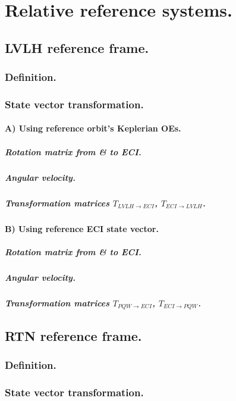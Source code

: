{\section{Relative reference systems.}
%
	
	\subsection{LVLH reference frame.}
		\subsubsection{Definition.}
		\subsubsection{State vector transformation.}
		\paragraph{A) Using reference orbit's Keplerian OEs. \\}
			\subparagraph{Rotation matrix from \& to ECI. \\}
			\subparagraph{Angular velocity. \\}
			\subparagraph{Transformation matrices $T_{LVLH\rightarrow ECI}$, $T_{ECI\rightarrow LVLH}$. \\}
		\paragraph{B) Using reference ECI state vector. \\}
			\subparagraph{Rotation matrix from \& to ECI. \\}
			\subparagraph{Angular velocity. \\}
			\subparagraph{Transformation matrices $T_{PQW\rightarrow ECI}$, $T_{ECI\rightarrow PQW}$. \\}
		
	\subsection{RTN reference frame.}
		\subsubsection{Definition.}
		\subsubsection{State vector transformation.}
}

